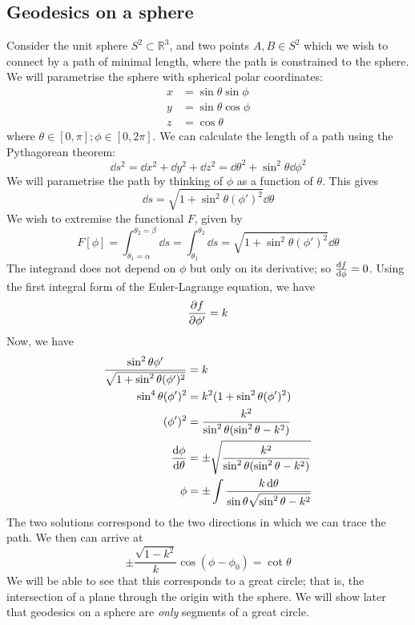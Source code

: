 \subsection{Geodesics on a sphere}
Consider the unit sphere \( S^2 \subset \mathbb R^3 \), and two points \( A, B \in S^2 \) which we wish to connect by a path of minimal length, where the path is constrained to the sphere.
We will parametrise the sphere with spherical polar coordinates:
\begin{align*}
	x & = \sin\theta \sin\phi \\
	y & = \sin\theta\cos\phi  \\
	z & = \cos\theta
\end{align*}
where \( \theta \in [0, \pi]; \phi \in [0, 2\pi] \).
We can calculate the length of a path using the Pythagorean theorem:
\[
	\dd{s}^2 = \dd{x}^2 + \dd{y}^2 + \dd{z}^2 = \dd{\theta}^2 + \sin^2 \theta \dd{\phi}^2
\]
We will parametrise the path by thinking of \( \phi \) as a function of \( \theta \).
This gives
\[
	\dd{s} = \sqrt{1 + \sin^2 \theta (\phi')^2} \dd{\theta}
\]
We wish to extremise the functional \( F \), given by
\[
	F[\phi] = \int_{\theta_1 = \alpha}^{\theta_2 = \beta} \dd{s} = \int_{\theta_1}^{\theta_2} \dd{s} = \sqrt{1 + \sin^2 \theta (\phi')^2} \dd{\theta}
\]
The integrand does not depend on \( \phi \) but only on its derivative; so \( \dv{f}{\phi} = 0 \).
Using the first integral form of the Euler-Lagrange equation, we have
\[
	\pdv{f}{\phi'} = k
\]
Now, we have
\begin{align*}
	\frac{\sin^2 \theta \phi'}{\sqrt{1 + \sin^2 \theta (\phi')^2}} & = k                                                                    \\
	\sin^4 \theta (\phi')^2                                        & = k^2 (1 + \sin^2 \theta (\phi')^2)                                    \\
	(\phi')^2                                                      & = \frac{k^2}{\sin^2 \theta (\sin^2 \theta - k^2)}                      \\
	\dv{\phi}{\theta}                                              & = \pm\sqrt{\frac{k^2}{\sin^2 \theta (\sin^2 \theta - k^2)}}            \\
	\phi                                                           & = \pm\int \frac{k \dd{\theta}}{\sin \theta \sqrt{\sin^2 \theta - k^2}} \\
\end{align*}
The two solutions correspond to the two directions in which we can trace the path.
We then can arrive at
\[
	\pm \frac{\sqrt{1 - k^2}}{k} \cos(\phi - \phi_0) = \cot \theta
\]
We will be able to see that this corresponds to a great circle; that is, the intersection of a plane through the origin with the sphere.
We will show later that geodesics on a sphere are \textit{only} segments of a great circle.

